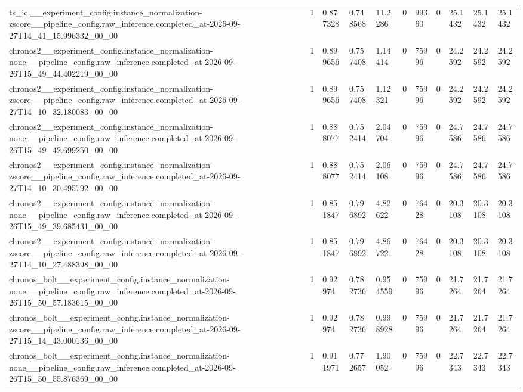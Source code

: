 \begin{tabular}{lllllllllll}
ts\_icl\_\_experiment\_config.instance\_normalization-zscore\_\_pipeline\_config.raw\_inference.completed\_at-2026-09-27T14\_41\_15.996332\_00\_00 & 1 & 0.877328 & 0.748568 & 11.2286 & 0 & 99360 & 0 & 25.1432 & 25.1432 & 25.1432 \\
chronos2\_\_experiment\_config.instance\_normalization-none\_\_pipeline\_config.raw\_inference.completed\_at-2026-09-26T15\_49\_44.402219\_00\_00 & 1 & 0.899656 & 0.757408 & 1.14414 & 0 & 75996 & 0 & 24.2592 & 24.2592 & 24.2592 \\
chronos2\_\_experiment\_config.instance\_normalization-zscore\_\_pipeline\_config.raw\_inference.completed\_at-2026-09-27T14\_10\_32.180083\_00\_00 & 1 & 0.899656 & 0.757408 & 1.12321 & 0 & 75996 & 0 & 24.2592 & 24.2592 & 24.2592 \\
chronos2\_\_experiment\_config.instance\_normalization-none\_\_pipeline\_config.raw\_inference.completed\_at-2026-09-26T15\_49\_42.699250\_00\_00 & 1 & 0.888077 & 0.752414 & 2.04704 & 0 & 75996 & 0 & 24.7586 & 24.7586 & 24.7586 \\
chronos2\_\_experiment\_config.instance\_normalization-zscore\_\_pipeline\_config.raw\_inference.completed\_at-2026-09-27T14\_10\_30.495792\_00\_00 & 1 & 0.888077 & 0.752414 & 2.06108 & 0 & 75996 & 0 & 24.7586 & 24.7586 & 24.7586 \\
chronos2\_\_experiment\_config.instance\_normalization-none\_\_pipeline\_config.raw\_inference.completed\_at-2026-09-26T15\_49\_39.685431\_00\_00 & 1 & 0.851847 & 0.796892 & 4.82622 & 0 & 76428 & 0 & 20.3108 & 20.3108 & 20.3108 \\
chronos2\_\_experiment\_config.instance\_normalization-zscore\_\_pipeline\_config.raw\_inference.completed\_at-2026-09-27T14\_10\_27.488398\_00\_00 & 1 & 0.851847 & 0.796892 & 4.86722 & 0 & 76428 & 0 & 20.3108 & 20.3108 & 20.3108 \\
chronos\_bolt\_\_experiment\_config.instance\_normalization-none\_\_pipeline\_config.raw\_inference.completed\_at-2026-09-26T15\_50\_57.183615\_00\_00 & 1 & 0.92974 & 0.782736 & 0.954559 & 0 & 75996 & 0 & 21.7264 & 21.7264 & 21.7264 \\
chronos\_bolt\_\_experiment\_config.instance\_normalization-zscore\_\_pipeline\_config.raw\_inference.completed\_at-2026-09-27T15\_14\_43.000136\_00\_00 & 1 & 0.92974 & 0.782736 & 0.998928 & 0 & 75996 & 0 & 21.7264 & 21.7264 & 21.7264 \\
chronos\_bolt\_\_experiment\_config.instance\_normalization-none\_\_pipeline\_config.raw\_inference.completed\_at-2026-09-26T15\_50\_55.876369\_00\_00 & 1 & 0.911971 & 0.772657 & 1.90052 & 0 & 75996 & 0 & 22.7343 & 22.7343 & 22.7343 \\

\end{tabular}
